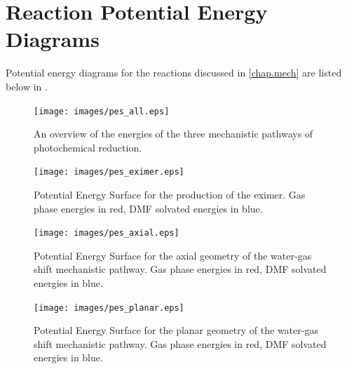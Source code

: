 \chapter{Reaction Potential Energy Diagrams} \label{app.energy}

Potential energy diagrams for the reactions discussed in \autoref{chap.mech} are listed below in . 

\begin{landscape}

\begin{figure}[!htbp]
 \begin{center}
  \texttt{[image: images/pes\_all.eps]}
 \end{center}
\caption[An overview of the energies of the three mechanistic pathways of photochemical  reduction.]{An overview of the energies of the three mechanistic pathways of photochemical  reduction.}
\label{fig.pes_all}
\end{figure}

\begin{figure}[!htbp]
 \begin{center}
  \texttt{[image: images/pes\_eximer.eps]}
 \end{center}
\caption[Potential Energy Surface for the production of the eximer.]{Potential Energy Surface for the production of the eximer. Gas phase energies in red, DMF solvated energies in blue.}
\label{fig.pes_eximer}
\end{figure}

 
\begin{figure}[!htbp]
 \begin{center}
  \texttt{[image: images/pes\_axial.eps]}
 \end{center}
\caption[Potential Energy Surface for the axial geometry of the water-gas shift mechanistic pathway.]{Potential Energy Surface for the axial geometry of the water-gas shift mechanistic pathway. Gas phase energies in red, DMF solvated energies in blue.}
\label{fig.pes_axial}
\end{figure} 

\begin{figure}[!htbp]
 \begin{center}
  \texttt{[image: images/pes\_planar.eps]}
 \end{center}
\caption[Potential Energy Surface for the planar geometry of the water-gas shift mechanistic pathway.]{Potential Energy Surface for the planar geometry of the water-gas shift mechanistic pathway. Gas phase energies in red, DMF solvated energies in blue.}
\label{fig.pes_planar}
\end{figure} 


\end{landscape}

